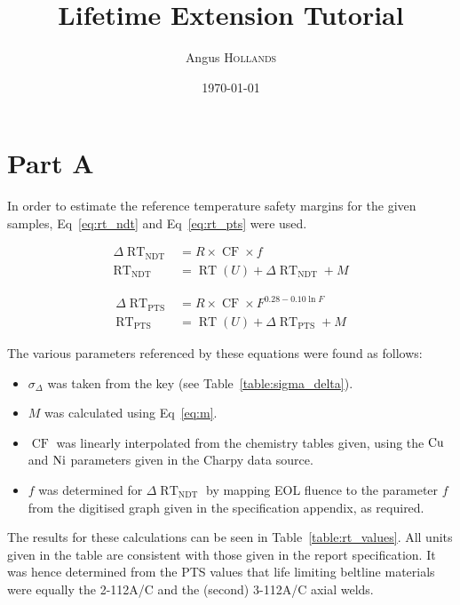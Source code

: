 \documentclass{article}
\title{Lifetime Extension Tutorial} %
\author{Angus \textsc{Hollands}} %
\date{\today} %
\newcommand\RT{\operatorname{RT}}
\begin{document}
\maketitle %


\section{Part A}
In order to estimate the reference temperature safety margins for the given samples, Eq~\ref{eq:rt_ndt} and Eq~\ref{eq:rt_pts} were used.
    
    \begin{align}
    \label{eq:rt_ndt}
        \Delta{\RT}_{\operatorname{NDT}} &= R\times \operatorname{CF} \times f \\
        \RT_{\operatorname{NDT}} &= \RT(U) + \Delta\RT_{\operatorname{NDT}} + M
    \end{align}
    
    \begin{align}
    \label{eq:rt_pts}
        \Delta{\RT}_{\operatorname{PTS}} &= R\times \operatorname{CF} \times F^{0.28 - 0.10\ln{F}} \\
        \RT_{\operatorname{PTS}} &= \RT(U) + \Delta\RT_{\operatorname{PTS}} + M
    \end{align}
    
    The various parameters referenced by these equations were found as follows:
    \begin{itemize}
    \item $\sigma_\Delta$ was taken from the key (see Table~\ref{table:sigma_delta}).
    \item $M$ was calculated using Eq~\ref{eq:m}.
    \item $\operatorname{CF}$ was linearly interpolated from the chemistry tables given, using the $\ce{Cu}$ and $\ce{Ni}$ parameters given in the Charpy data source.
    \item $f$ was determined for $\Delta{\RT}_{\operatorname{NDT}}$ by mapping EOL fluence to the parameter $f$ from the digitised graph given in the specification appendix, as required.
    \end{itemize}
    
    The results for these calculations can be seen in Table~\ref{table:rt_values}. All units given in the table are consistent with those given in the report specification. It was hence determined from the PTS values that life limiting beltline materials were equally the 2-112A/C and the (second) 3-112A/C axial welds.
    
\end{document}
